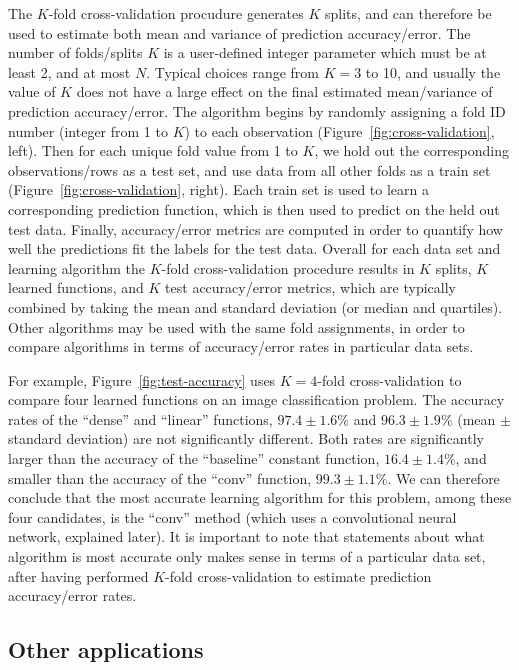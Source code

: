 \documentclass[12pt]{article}
\begin{document}
The $K$-fold cross-validation procudure generates $K$ splits, and can
therefore be used to estimate both mean and variance of prediction
accuracy/error. The number of folds/splits $K$ is a user-defined
integer parameter which must be at least 2, and at most $N$. Typical
choices range from $K=3$ to 10, and usually the value of $K$ does not
have a large effect on the final estimated mean/variance of prediction
accuracy/error. The algorithm begins by randomly assigning a fold ID
number (integer from 1 to $K$) to each observation
(Figure~\ref{fig:cross-validation}, left). Then for each unique fold
value from 1 to $K$, we hold out the corresponding observations/rows
as a test set, and use data from all other folds as a train set
(Figure~\ref{fig:cross-validation}, right). Each train set is used to
learn a corresponding prediction function, which is then used to
predict on the held out test data. Finally, accuracy/error metrics are
computed in order to quantify how well the predictions fit the labels
for the test data. Overall for each data set and learning algorithm
the $K$-fold cross-validation procedure results in $K$ splits, $K$
learned functions, and $K$ test accuracy/error metrics, which are
typically combined by taking the mean and standard deviation (or
median and quartiles). Other algorithms may be used with the same fold
assignments, in order to compare algorithms in terms of accuracy/error
rates in particular data sets.

For example, Figure~\ref{fig:test-accuracy} uses $K=4$-fold
cross-validation to compare four learned functions on an image
classification problem. The accuracy rates of the ``dense'' and
``linear'' functions, $97.4 \pm 1.6 \%$ and $96.3 \pm 1.9 \%$ (mean
$\pm$ standard deviation) are not significantly different. Both rates
are significantly larger than the accuracy of the ``baseline''
constant function, $16.4 \pm 1.4 \%$, and smaller than the accuracy of
the ``conv'' function, $99.3 \pm 1.1 \%$. We can therefore conclude
that the most accurate learning algorithm for this problem, among
these four candidates, is the ``conv'' method (which uses a
convolutional neural network, explained later).  It is important to
note that statements about what algorithm is most accurate only makes
sense in terms of a particular data set, after having performed
$K$-fold cross-validation to estimate prediction accuracy/error rates.

\subsection{Other applications}
\end{document}
